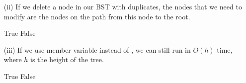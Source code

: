 \begin{parts}
\begin{enumerate}
        \item[(ii)] If we delete a node in our BST with duplicates, the nodes that we need to modify are the nodes on the path from this node to the root.
            \begin{oneparcheckboxes}
                \CorrectChoice True
                \choice False
            \end{oneparcheckboxes}

        \item[(iii)] If we use member variable  instead of , we can still run  in $O(h)$ time, where $h$ is the height of the tree.
            \begin{oneparcheckboxes}
                \choice True
                \CorrectChoice False
            \end{oneparcheckboxes}
    \end{enumerate}



\end{parts}